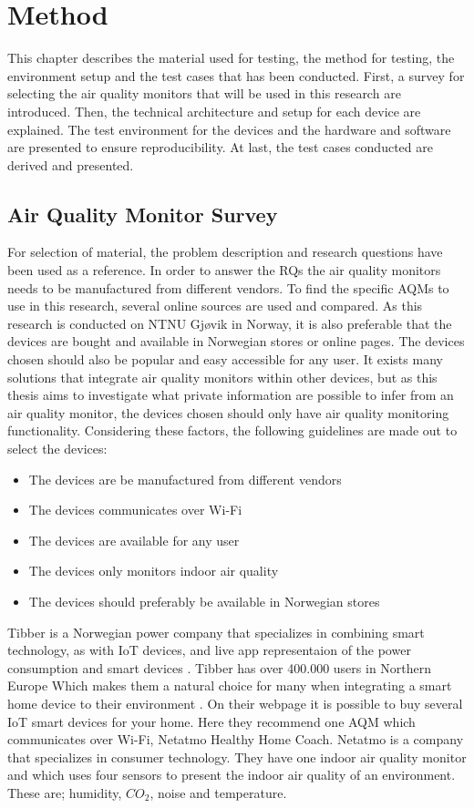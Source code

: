 \chapter{Method}
This chapter describes the material used for testing, the method for testing, the environment setup and the test cases that has been conducted. First, a survey for selecting the air quality monitors that will be used in this research are introduced. Then, the technical architecture and setup for each device are explained. The test environment for the devices and the hardware and software are presented to ensure reproducibility. At last, the test cases conducted are derived and presented. 
\section{Air Quality Monitor Survey}
For selection of material, the problem description and research questions have been used as a reference. In order to answer the RQs the air quality monitors needs to be manufactured from different vendors. To find the specific AQMs to use in this research, several online sources are used and compared. As this research is conducted on NTNU Gjøvik in Norway, it is also preferable that the devices are bought and available in Norwegian stores or online pages. The devices chosen should also be popular and easy accessible for any user. It exists many solutions that integrate air quality monitors within other devices, but as this thesis aims to investigate what private information are possible to infer from an air quality monitor, the devices chosen should only have air quality monitoring functionality.  Considering these factors, the following guidelines are made out to select the devices:
\begin{itemize}
    \item The devices are be manufactured from different vendors
    \item The devices communicates over Wi-Fi
    \item The devices are available for any user
    \item The devices only monitors indoor air quality
    \item The devices should preferably be available in Norwegian stores
\end{itemize}
Tibber \cite{Tibber} is a Norwegian power company that specializes in combining smart technology, as with IoT devices, and live app representaion of the power consumption and smart devices \cite{Tibber}.  Tibber has over 400.000 users in Northern Europe Which makes them a natural choice for many when integrating a smart home device to their environment \cite{TibberUsers}. On their webpage it is possible to buy several IoT smart devices for your home. Here they recommend one AQM which communicates over Wi-Fi, Netatmo Healthy Home Coach. Netatmo \cite{Netatmo} is a company that specializes in consumer technology. They have one indoor air quality monitor and which uses four sensors to present the indoor air quality of an environment. These are; humidity, \(CO_2\), noise and temperature. 
